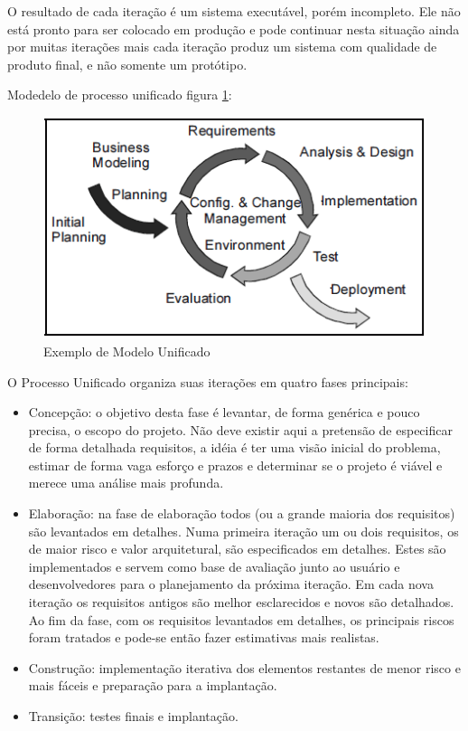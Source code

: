 \documentclass[	DIV=calc,%
							paper=a4,%
							fontsize=12pt,%
							onecolumn]{scrartcl}	 					%
\begin{document}
 O resultado de cada iteração é um sistema executável,  porém incompleto. Ele não está pronto para ser colocado em produção e pode continuar nesta situação ainda por muitas iterações mais cada iteração produz um sistema com qualidade de produto final, e não somente um protótipo.
 
  Modedelo de processo unificado figura \ref{rup1}: 
 \begin{figure}
	\centering
	\includegraphics[]{rup1.png}
	\caption{Exemplo de Modelo Unificado}
	\label{rup1}
\end{figure}
 
 O Processo Unificado organiza suas iterações em quatro fases principais:
\begin{itemize}

\item Concepção: o objetivo desta fase é levantar, de forma genérica e pouco precisa, o escopo do projeto. Não deve existir aqui a pretensão de especificar de forma detalhada requisitos, a idéia é ter uma visão inicial do problema, estimar de forma vaga esforço e prazos e determinar se o projeto é viável e merece uma análise mais profunda.

\item Elaboração: na fase de elaboração todos (ou a grande maioria dos requisitos) são levantados em detalhes. Numa primeira iteração um ou dois requisitos, os de maior risco e valor arquitetural, são especificados em detalhes. Estes são implementados e servem como base de avaliação junto ao usuário e desenvolvedores para o planejamento da próxima iteração. Em cada nova iteração os requisitos antigos são melhor esclarecidos e novos são detalhados. Ao fim da fase, com os requisitos levantados em detalhes, os principais riscos foram tratados e pode-se então fazer estimativas mais realistas.

\item Construção: implementação iterativa dos elementos restantes de menor risco e mais fáceis e preparação para a implantação.

\item Transição: testes finais e implantação.

\end{itemize}
\end{document}
